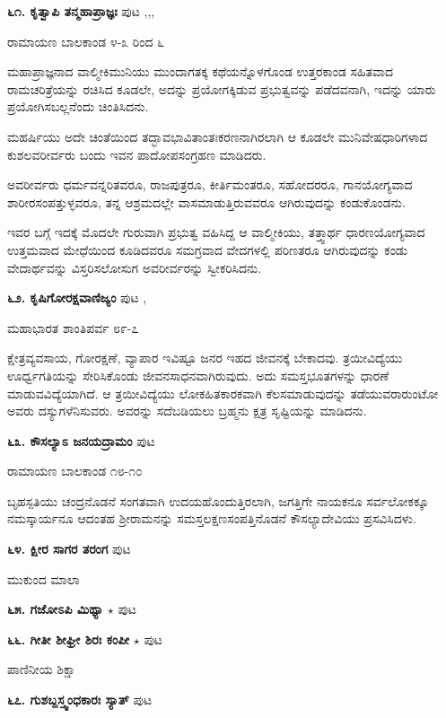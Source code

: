 \medskip
\noindent\textbf{೬೧. ಕೃತ್ವಾಪಿ ತನ್ಮಹಾಪ್ರಾಜ್ಞಃ} \hfill ಪುಟ \pageref{165},\pageref{167},\pageref{209},\pageref{238}

\hfill ರಾಮಾಯಣ ಬಾಲಕಾಂಡ ೪-೩ ರಿಂದ ೬

ಮಹಾಪ್ರಾಜ್ಞನಾದ ವಾಲ್ಮೀಕಿಮುನಿಯು ಮುಂದಾಗತಕ್ಕ ಕಥೆಯನ್ನೊಳಗೊಂಡ ಉತ್ತರಕಾಂಡ ಸಹಿತವಾದ ರಾಮಚರಿತ್ರೆಯನ್ನು ರಚಿಸಿದ ಕೂಡಲೇ, ಅದನ್ನು ಪ್ರಯೋಗಕ್ಕಿಡುವ ಪ್ರಭುತ್ವವನ್ನು ಪಡೆದವನಾಗಿ, ಇದನ್ನು ಯಾರು ಪ್ರಯೋಗಿಸಬಲ್ಲನೆಂದು ಚಿಂತಿಸಿದನು.

ಮಹರ್ಷಿಯು ಅದೇ ಚಿಂತೆಯಿಂದ ತದ್ಭಾವಭಾವಿತಾಂತಃಕರಣನಾಗಿರಲಾಗಿ ಆ ಕೂಡಲೇ ಮುನಿವೇಷಧಾರಿಗಳಾದ ಕುಶಲವರೀರ್ವರು ಬಂದು ಇವನ ಪಾದೋಪಸಂಗ್ರಹಣ ಮಾಡಿದರು.

ಅವರೀರ್ವರು ಧರ್ಮವನ್ನರಿತವರೂ, ರಾಜಪುತ್ರರೂ, ಕೀರ್ತಿಮಂತರೂ, ಸಹೋದರರೂ, ಗಾನಯೋಗ್ಯವಾದ ಶಾರೀರಸಂಪತ್ತುಳ್ಳವರೂ, ತನ್ನ ಆಶ್ರಮದಲ್ಲೇ ವಾಸಮಾಡುತ್ತಿರುವವರೂ ಆಗಿರುವುದನ್ನು ಕಂಡುಕೊಂಡನು.

ಇವರ ಬಗ್ಗೆ ಇದಕ್ಕೆ ಮೊದಲೇ ಗುರುವಾಗಿ ಪ್ರಭುತ್ವ ವಹಿಸಿದ್ದ ಆ ವಾಲ್ಮೀಕಿಯು, ತತ್ತ್ವಾರ್ಥ ಧಾರಣಯೋಗ್ಯವಾದ ಉತ್ತಮವಾದ ಮೇಧೆಯಿಂದ ಕೂಡಿದವರೂ ಸಮಗ್ರವಾದ ವೇದಗಳಲ್ಲಿ ಪರಿಣತರೂ ಆಗಿರುವುದನ್ನು ಕಂಡು ವೇದಾರ್ಥವನ್ನು ವಿಸ್ತರಿಸಲೋಸುಗ ಅವರೀರ್ವರನ್ನು ಸ್ವೀಕರಿಸಿದನು.

\medskip
\noindent\textbf{೬೨. ಕೃಷಿಗೋರಕ್ಷವಾಣಿಜ್ಯಂ} \hfill ಪುಟ \pageref{75},\pageref{225}

\hfill ಮಹಾಭಾರತ ಶಾಂತಿಪರ್ವ ೮೯-೭

ಕ್ಷೇತ್ರವ್ಯವಸಾಯ, ಗೋರಕ್ಷಣೆ, ವ್ಯಾಪಾರ ಇವಿಷ್ಟೂ ಜನರ ಇಹದ ಜೀವನಕ್ಕೆ ಬೇಕಾದವು. ತ್ರಯೀವಿದ್ಯೆಯು ಊರ್ಧ್ವಗತಿಯನ್ನು ಸೇರಿಸಿಕೊಂಡು ಜೀವನಸಾಧನವಾಗಿರುವುದು. ಅದು ಸಮಸ್ತಭೂತಗಳನ್ನು ಧಾರಣೆ ಮಾಡುವವಿದ್ಯೆಯಾಗಿದೆ. ಆ ತ್ರಯೀವಿದ್ಯೆಯು ಲೋಕಹಿತಕಾರಕವಾಗಿ ಕೆಲಸಮಾಡುವುದನ್ನು ತಡೆಯುವರಾರುಂಟೋ ಅವರು ದಸ್ಯುಗಳೆನಿಸುವರು. ಅವರನ್ನು ಸದೆಬಡಿಯಲು ಬ್ರಹ್ಮನು ಕ್ಷತ್ರ ಸೃಷ್ಟಿಯನ್ನು ಮಾಡಿದನು.

\medskip
\noindent\textbf{೬೩. ಕೌಸಲ್ಯಾಽ ಜನಯದ್ರಾಮಂ} \hfill ಪುಟ \pageref{252}

\hfill ರಾಮಾಯಣ ಬಾಲಕಾಂಡ ೧೮-೧೦

ಬೃಹಸ್ಪತಿಯು ಚಂದ್ರನೊಡನೆ ಸಂಗತವಾಗಿ ಉದಯಹೊಂದುತ್ತಿರಲಾಗಿ, ಜಗತ್ತಿಗೇ ನಾಯಕನೂ ಸರ್ವಲೋಕಕ್ಕೂ ನಮಸ್ಕಾರ್ಯನೂ ಆದಂತಹ ಶ್ರೀರಾಮನನ್ನು ಸಮಸ್ತಲಕ್ಷಣಸಂಪತ್ತಿನೊಡನೆ ಕೌಸಲ್ಯಾದೇವಿಯು ಪ್ರಸವಿಸಿದಳು.

\medskip
\noindent\textbf{೬೪. ಕ್ಷೀರ ಸಾಗರ ತರಂಗ} \hfill ಪುಟ \pageref{147}

\hfill ಮುಕುಂದ ಮಾಲಾ

\medskip
\noindent\textbf{೬೫. ಗಜೋಽಪಿ ಮಿಥ್ಯಾ} $\star$ \hfill ಪುಟ \pageref{54}

\medskip
\noindent\textbf{೬೬. ಗೀತೀ ಶೀಘ್ರೀ ಶಿರಃ ಕಂಪೀ} $\star$ \hfill ಪುಟ \pageref{5}

\hfill ಪಾಣಿನೀಯ ಶಿಕ್ಷಾ
 
\medskip
\noindent\textbf{೬೭. ಗುಶಬ್ದಸ್ತ್ವಂಧಕಾರಃ ಸ್ಯಾತ್} \hfill ಪುಟ \pageref{98}

